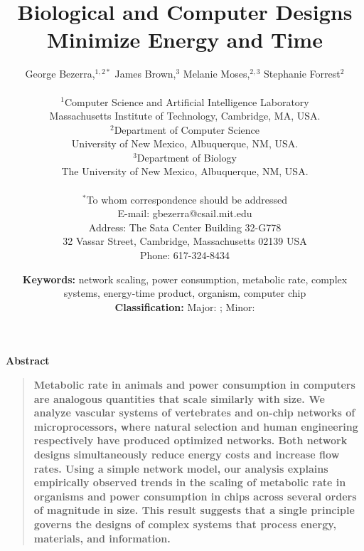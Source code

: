 \documentclass[12pt]{article}
\title{Biological and Computer Designs Minimize Energy and Time}
\author
{George Bezerra,$^{1,2\ast}$  James Brown,$^{3}$ Melanie 
Moses,$^{2,3}$ Stephanie Forrest$^{2}$\\
\\
\normalsize{$^{1}$Computer Science and Artificial Intelligence 
Laboratory}\\
\normalsize{Massachusetts Institute of Technology, Cambridge, MA, 
USA.}\\
\normalsize{$^{2}$Department of Computer Science}\\
\normalsize{University of New Mexico, Albuquerque, NM, USA.}\\
\normalsize{$^{3}$Department of Biology}\\
\normalsize{The University of New Mexico, Albuquerque, NM, USA.}\\
\\
\normalsize{$^\ast$To whom correspondence should be addressed}\\
\normalsize{E-mail: gbezerra@csail.mit.edu}\\
\normalsize{Address: The Sata Center Building 32-G778}\\
\normalsize{32 Vassar Street, Cambridge, Massachusetts 02139 USA}\\
\normalsize{Phone: 617-324-8434}\\
}
\date{\normalsize{{\bf Keywords:} network scaling, power consumption, 
metabolic rate, complex systems, energy-time product, organism, 
computer chip}\\
\normalsize{{\bf Classification:} Major: ; Minor: }}
\newenvironment{sciabstract}{%
\begin{quote} \bf}
{\end{quote}}
\begin{document}
 


\baselineskip24pt


\maketitle 


\newpage


\centerline{\Large{\bf Abstract}}
\begin{sciabstract}
  Metabolic rate in animals and power consumption in computers are
  analogous quantities that scale similarly with size.  We analyze
  vascular systems of vertebrates and on-chip networks of
  microprocessors, where natural selection and human engineering
  respectively have produced optimized networks.  
Both network designs
  simultaneously reduce energy costs and increase flow rates.  Using a
  simple network model, our analysis explains empirically observed
  trends in the scaling of metabolic rate in organisms and power
  consumption in chips across several orders of magnitude in size.
  This result suggests that a single principle governs the designs of
  complex systems that process energy, materials, and
  information.
\end{sciabstract}

\newpage
\end{document}
